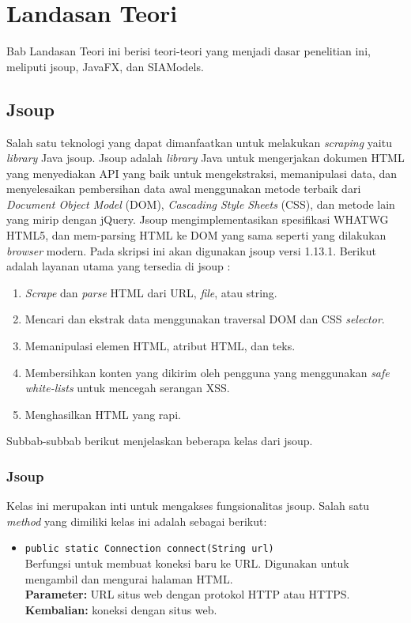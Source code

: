 \chapter{Landasan Teori}
\label{chap:teori}

Bab Landasan Teori ini berisi teori-teori yang menjadi dasar penelitian ini, meliputi jsoup, JavaFX, dan SIAModels.

\section{Jsoup}
\label{sec:jsoup} 
 
Salah satu teknologi yang dapat dimanfaatkan untuk melakukan \textit{scraping} yaitu \textit{library} Java jsoup. Jsoup adalah \textit{library} Java untuk mengerjakan dokumen HTML yang menyediakan API yang baik untuk mengekstraksi, memanipulasi data, dan menyelesaikan pembersihan data awal menggunakan metode terbaik dari \textit{Document Object Model} (DOM), \textit{Cascading Style Sheets} (CSS), dan metode lain yang mirip dengan jQuery. Jsoup mengimplementasikan spesifikasi WHATWG HTML5, dan mem-parsing HTML ke DOM yang sama seperti yang dilakukan \textit{browser} modern. Pada skripsi ini akan digunakan jsoup versi 1.13.1. Berikut adalah layanan utama yang tersedia di jsoup \cite{jsoup}:
\begin{enumerate}
    \item \textit{Scrape} dan \textit{parse} HTML dari URL, \textit{file}, atau string.
    \item Mencari dan ekstrak data menggunakan traversal DOM dan CSS \textit{selector}.
    \item Memanipulasi elemen HTML, atribut HTML, dan teks.
    \item Membersihkan konten yang dikirim oleh pengguna yang menggunakan \textit{safe white-lists} untuk mencegah serangan XSS.
    \item Menghasilkan HTML yang rapi.
\end{enumerate}

Subbab-subbab berikut menjelaskan beberapa kelas dari jsoup.


\subsection{Jsoup}
Kelas ini merupakan inti untuk mengakses fungsionalitas jsoup. Salah satu \textit{method} yang dimiliki kelas ini adalah sebagai berikut:

\begin{itemize}
    \item \texttt{public static Connection connect(String url)}\\
    Berfungsi untuk membuat koneksi baru ke URL. Digunakan untuk mengambil dan mengurai halaman HTML.\\
    \textbf{Parameter:} URL situs web dengan protokol HTTP atau HTTPS.\\
    \textbf{Kembalian:} koneksi dengan situs web.
\end{itemize}


